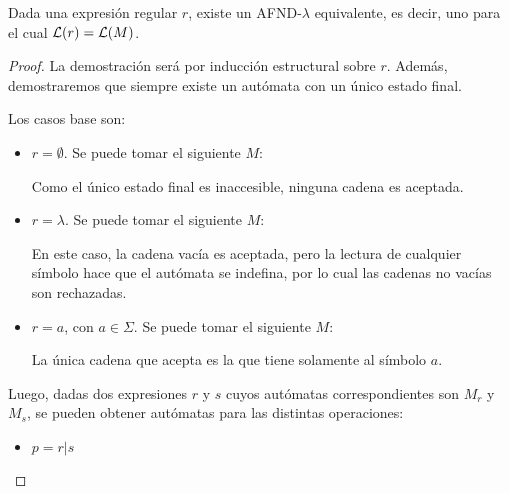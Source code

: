 \begin{theorem*}
    Dada una expresión regular $r$, existe un AFND-$\lambda$ equivalente, es decir, uno para el cual $\mathcal{L}(r) = \mathcal{L}(M)$.
\end{theorem*}
\begin{proof}
    La demostración será por inducción estructural sobre $r$. Además, demostraremos que siempre existe un autómata con un único estado final.

    Los casos base son:
    \begin{itemize}
        \item $r = \emptyset$. Se puede tomar el siguiente $M$:
        \begin{figure}[H]
            \centering
        \end{figure}

        Como el único estado final es inaccesible, ninguna cadena es aceptada.
        \item $r = \lambda$. Se puede tomar el siguiente $M$:
        \begin{figure}[H]
            \centering
        \end{figure}

        En este caso, la cadena vacía es aceptada, pero la lectura de cualquier símbolo hace que el autómata se indefina, por lo cual las cadenas no vacías son rechazadas.
        \item $r = a$, con $a \in \Sigma$. Se puede tomar el siguiente $M$:
        \begin{figure}[H]
            \centering
        \end{figure}

        La única cadena que acepta es la que tiene solamente al símbolo $a$.
    \end{itemize}

    Luego, dadas dos expresiones $r$ y $s$ cuyos autómatas correspondientes son $M_r$ y $M_s$, se pueden obtener autómatas para las distintas operaciones:
    \begin{itemize}
        \item $p = r|s$
    \end{itemize}
\end{proof}

